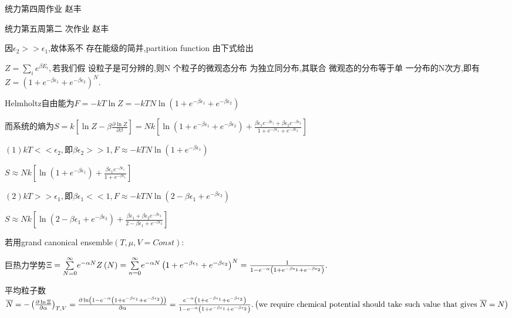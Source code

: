 \documentclass{ctexart}
\begin{document}
\bigskip 统力第四周作业 \qquad 
赵丰

\bigskip \bigskip 统力第五周第二%
次作业 \qquad 赵丰

\bigskip 



因$\epsilon _{2}>>\epsilon _{1}$,故体系不%
存在能级的简并,partition function 
由下式给出

$Z=\underset{i}{\sum }e^{\beta E_{i}},$若我们假%
设粒子是可分辨的,则N%
个粒子的微观态分布%
为独立同分布,其联合%
微观态的分布等于单%
一分布的N次方,即有\qquad $%
Z=\left( 1+e^{-\beta \epsilon _{1}}+e^{-\beta \epsilon _{2}}\right) ^{N}.$

Helmholtz自由能为\qquad $F=-kT\ln Z=-kTN\ln \left(
1+e^{-\beta \epsilon _{1}}+e^{-\beta \epsilon _{2}}\right) $

而系统的熵为\qquad $S=k\left[ \ln
Z-\beta \frac{\partial \ln Z}{\partial \beta }\right] =Nk\left[ \ln \left(
1+e^{-\beta \epsilon _{1}}+e^{-\beta \epsilon _{2}}\right) +\frac{\beta
\epsilon _{1}e^{-\beta \epsilon _{1}}+\beta \epsilon _{2}e^{-\beta \epsilon
_{2}}}{1+e^{-\beta \epsilon _{1}}+e^{-\beta \epsilon _{2}}}\right] $

$\left( 1\right) kT<<\epsilon _{2},$即$\beta \epsilon _{2}>>1,F\approx
-kTN\ln \left( 1+e^{-\beta \epsilon _{1}}\right) $

$S\approx Nk\left[ \ln \left( 1+e^{-\beta \epsilon _{1}}\right) +\frac{\beta
\epsilon _{1}e^{-\beta \epsilon _{1}}}{1+e^{-\beta \epsilon _{1}}}\right] $

\bigskip $\left( 2\right) kT>>\epsilon _{1},即 \beta \epsilon
_{1}<<1,F\approx -kTN\ln \left( 2-\beta \epsilon _{1}+e^{-\beta \epsilon
_{2}}\right) $

$S\approx Nk\left[ \ln \left( 2-\beta \epsilon _{1}+e^{-\beta \epsilon
_{2}}\right) +\frac{\beta \epsilon _{1}+\beta \epsilon _{2}e^{-\beta
\epsilon _{2}}}{2-\beta \epsilon _{1}+e^{-\beta \epsilon _{2}}}\right] $

\bigskip

\bigskip 若用grand canonical ensemble$\left( T,\mu
,V=Const\right) :$

巨热力学势$\Xi =\underset{N=0}{\overset{\infty 
}{\sum }}e^{-\alpha N}Z\left( N\right) =\underset{n=0}{\overset{\infty }{%
\sum }}e^{-\alpha N}\left( 1+e^{-\beta \epsilon _{1}}+e^{-\beta \epsilon
_{2}}\right) ^{N}=\frac{1}{1-e^{-\alpha }\left( 1+e^{-\beta \epsilon
_{1}}+e^{-\beta \epsilon _{2}}\right) }.$

平均粒子数$\overline{N}=-\left( \frac{\partial
\ln \Xi }{\partial \alpha }\right) _{T,V}=\frac{\partial \ln \left(
1-e^{-\alpha }\left( 1+e^{-\beta \epsilon _{1}}+e^{-\beta \epsilon
_{2}}\right) \right) }{\partial \alpha }=\allowbreak \frac{e^{-\alpha
}\left( 1+e^{-\beta \epsilon _{1}}+e^{-\beta \epsilon _{2}}\right) }{%
1-e^{-\alpha }\left( 1+e^{-\beta \epsilon _{1}}+e^{-\beta \epsilon
_{2}}\right) }\allowbreak \allowbreak .\left( \text{we require chemical
potential should take such value that gives }\overline{N}=N\right) $
\end{document}
